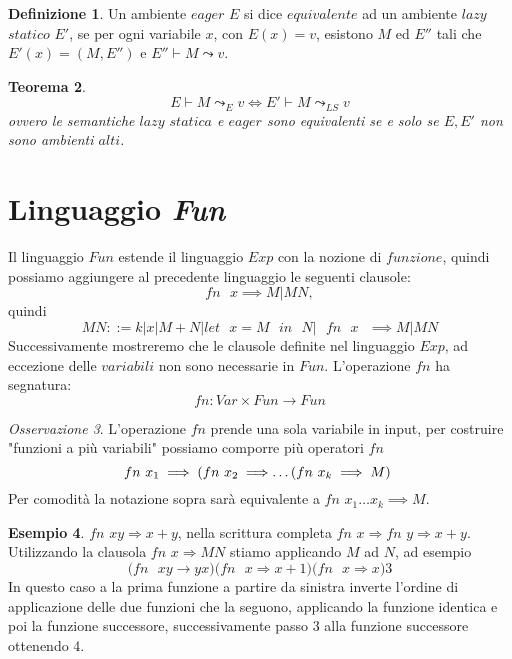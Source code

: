\documentclass{article}
\newtheorem{theorem}{Teorema}[section]
\theoremstyle{definition}
\theoremstyle{definition}
\theoremstyle{definition}
\newtheorem{definition}[theorem]{Definizione}
\newtheorem{example}[theorem]{Esempio}
\theoremstyle{remark}
\newtheorem{remark}[theorem]{Osservazione}
\begin{document}
    \begin{definition}
        Un ambiente $eager$ $E$ si dice $equivalente$ ad un ambiente $lazy$ $statico$ $E'$, se per ogni variabile $x$,  con $E(x)=v$, esistono $M$ ed $E''$ tali che $E'(x) = (M,E'')$ e $E''\vdash M \leadsto v$.
    \end{definition}
    \begin{theorem}
        $$E\vdash M \leadsto_E v \iff E' \vdash M \leadsto_{LS} v$$
        ovvero le semantiche $lazy$ $statica$ e $eager$ sono equivalenti se e solo se $E,E'$ non sono ambienti $alti$.
    \end{theorem}
    \section{Linguaggio \textit{Fun}}
    Il linguaggio $Fun$ estende il linguaggio $Exp$ con la nozione di $funzione$, quindi possiamo aggiungere al precedente linguaggio le seguenti clausole:
    $$ \text{$fn$ $x$} \implies M|MN,$$
    quindi
    $$MN ::= k|x|M+N|\text{$let$ $x=M$ $in$ $N|$ $fn$ $x$ }\implies M|MN$$
    Successivamente mostreremo che le clausole definite nel linguaggio $Exp$, ad eccezione delle $variabili$ non sono necessarie in $Fun$. L'operazione $fn$ ha segnatura:
$$fn: Var\times Fun \to Fun$$
\begin{remark}
    L'operazione $fn$ prende una sola variabile in input, per costruire "funzioni a più variabili" possiamo comporre più operatori $fn$
    $$\text{$fn$ $x_1 \implies (fn$ $x_2\implies$\dots($fn$ $x_k\implies M$) }$$
    Per comodità la notazione sopra sarà equivalente a $fn$ $x_1\dots x_k\implies M$.
\end{remark}
\begin{example}
    $fn$ $xy\Rightarrow x+y$, nella scrittura completa $fn$ $x\Rightarrow fn$ $y\Rightarrow x+y$.
    Utilizzando la clausola $fn$ $x\Rightarrow MN$ stiamo applicando $M$ ad $N$, ad esempio
    $$\text{$(fn$ $xy\rightarrow yx)$$(fn$ $x\Rightarrow x+1)$$(fn$ $x\Rightarrow x)3$}$$
    In questo caso a la prima funzione a partire da sinistra inverte l'ordine di applicazione delle due funzioni che la seguono,
    applicando la funzione identica e poi la funzione successore, successivamente passo $3$ alla funzione successore ottenendo $4$.
\end{example}
\end{document}
